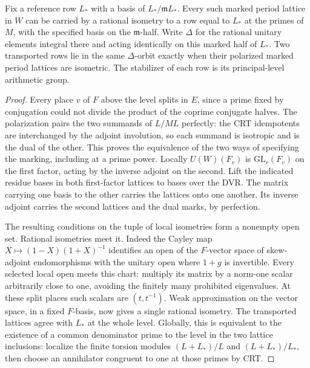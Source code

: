 \begin{lemma}\label{munf:marks}
Fix a reference row \(L_*\) with a basis of \(L_*/\mathfrak mL_*\).
Every such marked period lattice in \(W\) can be carried by a rational
isometry to a row equal to \(L_*\) at the primes of \(M\), with the
specified basis on the \(\mathfrak m\)-half. Write \(\Delta\) for the
rational unitary elements integral there and acting identically on this
marked half of \(L_*\). Two transported rows lie in the same
\(\Delta\)-orbit exactly when their polarized marked period lattices
are isometric. The stabilizer of each row is its principal-level
arithmetic group.
\end{lemma}
\begin{proof}
Every place \(v\) of \(F\) above the level splits in \(E\), since a
prime fixed by conjugation could not divide the product of the
coprime conjugate halves. The polarization pairs the two summands of
\(L/ML\) perfectly: the CRT idempotents are interchanged by the
adjoint involution, so each summand is isotropic and is the dual of the
other. This proves the equivalence of the two ways of specifying
the marking, including at a prime power. Locally \(U(W)(F_v)\) is
\(\mathrm{GL}_r(F_v)\) on the first factor, acting by the inverse
adjoint on the second. Lift the indicated residue bases in both
first-factor lattices to bases over the DVR. The matrix carrying one
basis to the other carries the lattices onto one another. Its inverse
adjoint carries the second lattices and the dual marks, by perfection.

The resulting conditions on the tuple of local isometries form a
nonempty open set. Rational isometries meet it. Indeed the Cayley
map \(X\mapsto(1-X)(1+X)^{-1}\) identifies an open of the
\(F\)-vector space of skew-adjoint endomorphisms with the unitary
open where \(1+g\) is invertible. Every selected local open meets
this chart: multiply its matrix by a norm-one scalar arbitrarily
close to one, avoiding the finitely many prohibited eigenvalues.
At these split places such scalars are \((t,t^{-1})\).
Weak approximation on the vector space, in a fixed \(F\)-basis,
now gives a single rational isometry. The transported lattices agree
with \(L_*\) at the whole level. Globally, this is equivalent to the
existence of a common denominator prime to the level in the two
lattice inclusions: localize the finite torsion modules
\((L+L_*)/L\) and \((L+L_*)/L_*\), then choose an annihilator
congruent to one at those primes by CRT.


\end{proof}
